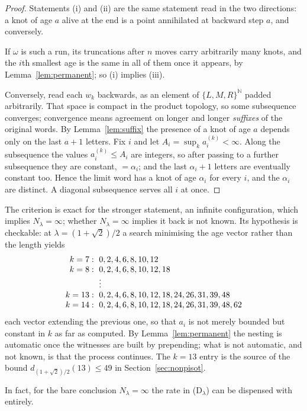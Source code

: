 \documentclass[11pt,reqno]{amsart}
\theoremstyle{plain}
\theoremstyle{definition}
\theoremstyle{remark}
\begin{document}
\begin{proof}
Statements (i) and (ii) are the same statement read in the two directions: a
knot of age $a$ alive at the end is a point annihilated at backward step $a$,
and conversely.

If $\omega$ is such a run, its truncations after $n$ moves carry arbitrarily
many knots, and the $i$th smallest age is the same in all of them once it
appears, by Lemma~\ref{lem:permanent}; so (i) implies (iii).

Conversely, read each $w_k$ backwards, as an element of
$\{L,M,R\}^{\mathbb N}$ padded arbitrarily. That space is compact in the
product topology, so some subsequence converges; convergence means agreement on
longer and longer \emph{suffixes} of the original words. By
Lemma~\ref{lem:suffix} the presence of a knot of age $a$ depends only on the
last $a+1$ letters. Fix $i$ and let $A_i=\sup_ka_i^{(k)}<\infty$. Along the
subsequence the values $a_i^{(k)}\leq A_i$ are integers, so after passing to a
further subsequence they are constant, $=\alpha_i$; and the last $\alpha_i+1$
letters are eventually constant too. Hence the limit word has a knot of age
$\alpha_i$ for every $i$, and the $\alpha_i$ are distinct. A diagonal
subsequence serves all $i$ at once.
\end{proof}

The criterion is exact for the stronger statement, an infinite configuration,
which implies $N_\lambda=\infty$; whether $N_\lambda=\infty$ implies it back is
not known. Its hypothesis is checkable: at $\lambda=(1+\sqrt2)/2$ a search
minimising the age vector rather than the length yields
\[
\begin{array}{r@{\;}l}
k=7:&\ 0,2,4,6,8,10,12\\
k=8:&\ 0,2,4,6,8,10,12,18\\
&\ \vdots\\
k=13:&\ 0,2,4,6,8,10,12,18,24,26,31,39,48\\
k=14:&\ 0,2,4,6,8,10,12,18,24,26,31,39,48,62
\end{array}
\]
each vector extending the previous one, so that $a_i$ is not merely bounded but
constant in $k$ as far as computed. By Lemma~\ref{lem:permanent} the nesting is
automatic once the witnesses are built by prepending; what is not automatic,
and not known, is that the process continues. The $k=13$ entry is the source of
the bound $d_{(1+\sqrt2)/2}(13)\leq49$ in Section~\ref{sec:nonpisot}.

In fact, for the bare conclusion $N_\lambda=\infty$ the rate in
(D$_\lambda$) can be dispensed with entirely.
\end{document}
